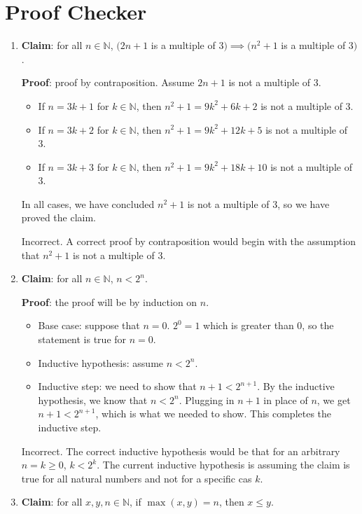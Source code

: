 \documentclass[11pt]{article}
\newcommand*{\Question}[1]{\vfill\pagebreak[3]\section{#1}}
\newenvironment{Parts}{\begin{enumerate}[label=(\alph*)]}{\end{enumerate}}
\newcommand*{\Part}{\item}
\newenvironment{Answer}{\vspace{20pt}}{\vspace{20pt}}
\newcommand*{\N}{\mathbb{N}}
\begin{document}
\Question{Proof Checker}

\begin{Parts}

\Part \textbf{Claim}: for all $n\in\N$, $(2n+1$ is a multiple of $3) \implies (n^2+1$ is a multiple of $3)$.

\textbf{Proof}: proof by contraposition. Assume $2n+1$ is not a multiple of 3.
\begin{itemize}
\item If $n=3k+1$ for $k\in\N$, then $n^2+1=9k^2+6k+2$ is not a multiple of 3.
\item If $n=3k+2$ for $k\in\N$, then $n^2+1=9k^2+12k+5$ is not a multiple of 3.
\item If $n=3k+3$ for $k\in\N$, then $n^2+1=9k^2+18k+10$ is not a multiple of 3.
\end{itemize}
In all cases, we have concluded $n^2+1$ is not a multiple of 3, so we have proved the claim.

\begin{Answer}
Incorrect. A correct proof by contraposition would begin with the assumption that $n^2+1$ is not a multiple of 3. 

\end{Answer}

\Part \textbf{Claim}: for all $n\in\N$, $n<2^n$.

\textbf{Proof}: the proof will be by induction on $n$.
\begin{itemize}
\item Base case: suppose that $n=0$. $2^0=1$ which is greater than $0$, so the statement is true for $n=0$.
\item Inductive hypothesis: assume $n<2^n$.
\item Inductive step: we need to show that $n+1<2^{n+1}$. By the inductive hypothesis, we know that $n<2^n$. Plugging in $n+1$ in place of $n$, we get $n+1<2^{n+1}$, which is what we needed to show. This completes the inductive step.
\end{itemize}

\begin{Answer}
Incorrect. The correct inductive hypothesis would be that for an arbitrary $n=k \geq 0$, $k<2^k$. The current inductive hypothesis is assuming the claim is true for all natural numbers and not for a specific cas $k$.

\end{Answer}

\Part \textbf{Claim}: for all $x,y,n\in\N$, if $\max(x,y)=n$, then $x\leq y$.


\end{Parts}
\end{document}
